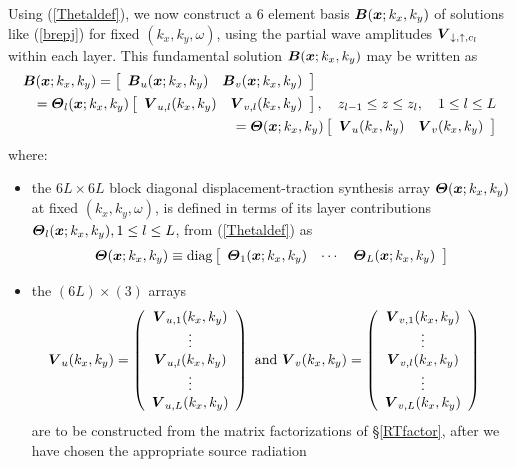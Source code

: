 Using (\ref{Thetaldef}), we now construct a $6 $ element basis 
${\mbox{\boldmath$\mit B$\unboldmath}} ({\mbox{\boldmath$\mit x$\unboldmath}};k_{x},k_{y})$ of solutions like (\ref{brepj}) 
for fixed $(k_{x},k_{y},\omega)$, using the partial wave amplitudes 
${\mbox{\boldmath$\mit V$\unboldmath}}_{\downarrow,\uparrow ,c_{l} 
}$ within each layer. 
This fundamental solution ${\mbox{\boldmath$\mit B$\unboldmath}} ({\mbox{\boldmath$\mit x$\unboldmath}};k_{x},k_{y})$ may be 
written  as
\begin{eqnarray} \label{fundamental}
\lefteqn{{\bmi B} ({\bmi x};k_{x},k_{y}) = 
\left[\begin{array}{cc} {\bmi  B}_{u} ({\bmi x};k_{x},k_{y}) & {\bmi  
B}_{v} ({\bmi x};k_{x},k_{y})\end{array}\right]}\nonumber\\
&&= {\bmi \Theta}_{l}({\bmi x};k_{x},k_{y})
\left[\begin{array}{cc} {\bmi  V}_{u,l}(k_{x},k_{y}) & {\bmi  
V}_{v,l}(k_{x},k_{y})\end{array}\right], \quad     z_{l-1}\le z \le z_{l}, \quad 
 1 \le l \le L\nonumber\\
 &&= {\bmi \Theta}({\bmi x};k_{x},k_{y})\left[\begin{array}{cc} 
 {\bmi  V}_{u}(k_{x},k_{y}) & 
 {\bmi  V}_{v}(k_{x},k_{y})\end{array}\right]
\end{eqnarray} 
where:
\begin{itemize}
\item 
the  $6L\times 6 L$ block diagonal displacement-traction synthesis array 
${\mbox{\boldmath$\mit \Theta$\unboldmath}}({\mbox{\boldmath$\mit x$\unboldmath}};k_{x},k_{y})$ at fixed $(k_x,k_y,\omega)$,
 is defined in terms of its layer contributions 
${\mbox{\boldmath$\mit \Theta$\unboldmath}}_{l}({\mbox{\boldmath$\mit x$\unboldmath}};k_{x},k_{y}), 1\le l \le L$, from 
(\ref{Thetaldef}) as
\[
{\mbox{\boldmath$\mit \Theta$\unboldmath}}({\mbox{\boldmath$\mit x$\unboldmath}};k_{x},k_{y})\equiv
\mbox{diag}\left[\begin{array}{ccc}{\mbox{\boldmath$\mit \Theta$\unboldmath}}_{1}({\mbox{\boldmath$\mit x$\unboldmath}};k_{x},k_{y})&
\cdots& {\mbox{\boldmath$\mit \Theta$\unboldmath}}_{L}({\mbox{\boldmath$\mit x$\unboldmath}};k_{x},k_{y})  \end{array}  \right]
\]
\item the $(6  L)\times (3 )$ arrays 
\begin{equation} \label{Vvw} 
\!\!\!\!\!\!
{\mbox{\boldmath$\mit V$\unboldmath}}_{u}(k_{x},k_{y})=
\left(\begin{array}{c} 
{{\mbox{\boldmath$\mit V$\unboldmath}}}_{ u,1}(k_{x},k_{y})\\
\vdots\\ {{\mbox{\boldmath$\mit V$\unboldmath}}}_{ u,l}(k_{x},k_{y})\\
\vdots\\  {{\mbox{\boldmath$\mit V$\unboldmath}}}_{ u,L}(k_{x},k_{y})
\end{array}\right) \ \mbox{and} \
{\mbox{\boldmath$\mit V$\unboldmath}}_{v}(k_{x},k_{y})=
\left(\begin{array}{c} 
{{\mbox{\boldmath$\mit V$\unboldmath}}}_{ v,1}(k_{x},k_{y})\\
\vdots\\ {{\mbox{\boldmath$\mit V$\unboldmath}}}_{ v,l}(k_{x},k_{y})\\
\vdots\\  {{\mbox{\boldmath$\mit V$\unboldmath}}}_{ v,L}(k_{x},k_{y})
\end{array}\right)
\end{equation}
are to be constructed from the matrix factorizations of \S\ref{RTfactor}, after we 
have chosen the appropriate source radiation
\end{itemize}
